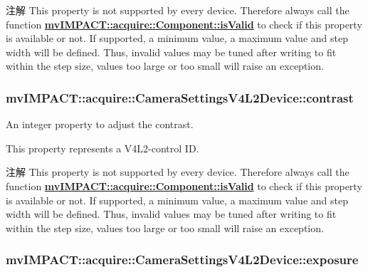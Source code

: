 \begin{DoxyNote}{注解}
This property is not supported by every device. Therefore always call the function {\bfseries \hyperlink{classmv_i_m_p_a_c_t_1_1acquire_1_1_component_ac51e55e7e046101f3c6119d84123abd5}{mv\+I\+M\+P\+A\+C\+T\+::acquire\+::\+Component\+::is\+Valid}} to check if this property is available or not. If supported, a minimum value, a maximum value and step width will be defined. Thus, invalid values may be tuned after writing to fit within the step size, values too large or too small will raise an exception. 
\end{DoxyNote}
\hypertarget{classmv_i_m_p_a_c_t_1_1acquire_1_1_camera_settings_v4_l2_device_aaee19b888e84b7037f73cf87113a331e}{
\subsubsection[{contrast}]{ mv\+I\+M\+P\+A\+C\+T\+::acquire\+::\+Camera\+Settings\+V4\+L2\+Device\+::contrast}}\label{classmv_i_m_p_a_c_t_1_1acquire_1_1_camera_settings_v4_l2_device_aaee19b888e84b7037f73cf87113a331e}


An integer property to adjust the contrast. 

This property represents a V4\+L2-\/control I\+D.

\begin{DoxyNote}{注解}
This property is not supported by every device. Therefore always call the function {\bfseries \hyperlink{classmv_i_m_p_a_c_t_1_1acquire_1_1_component_ac51e55e7e046101f3c6119d84123abd5}{mv\+I\+M\+P\+A\+C\+T\+::acquire\+::\+Component\+::is\+Valid}} to check if this property is available or not. If supported, a minimum value, a maximum value and step width will be defined. Thus, invalid values may be tuned after writing to fit within the step size, values too large or too small will raise an exception. 
\end{DoxyNote}
\hypertarget{classmv_i_m_p_a_c_t_1_1acquire_1_1_camera_settings_v4_l2_device_a35d158bd71d3210bb08f828a8a3f8295}{
\subsubsection[{exposure}]{ mv\+I\+M\+P\+A\+C\+T\+::acquire\+::\+Camera\+Settings\+V4\+L2\+Device\+::exposure}}\label{classmv_i_m_p_a_c_t_1_1acquire_1_1_camera_settings_v4_l2_device_a35d158bd71d3210bb08f828a8a3f8295}


